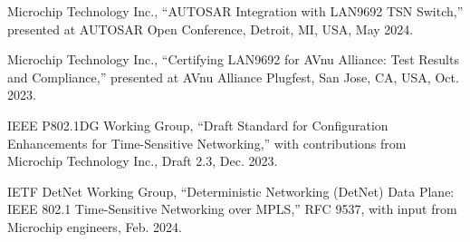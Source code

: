 \documentclass[10pt, journal, compsoc]{IEEEtran}
\begin{document}
\begin{thebibliography}{99}
Microchip Technology Inc., ``AUTOSAR Integration with LAN9692 TSN Switch,'' presented at AUTOSAR Open Conference, Detroit, MI, USA, May 2024.

Microchip Technology Inc., ``Certifying LAN9692 for AVnu Alliance: Test Results and Compliance,'' presented at AVnu Alliance Plugfest, San Jose, CA, USA, Oct. 2023.

IEEE P802.1DG Working Group, ``Draft Standard for Configuration Enhancements for Time-Sensitive Networking,'' with contributions from Microchip Technology Inc., Draft 2.3, Dec. 2023.

IETF DetNet Working Group, ``Deterministic Networking (DetNet) Data Plane: IEEE 802.1 Time-Sensitive Networking over MPLS,'' RFC 9537, with input from Microchip engineers, Feb. 2024.

\end{thebibliography}
\end{document}
